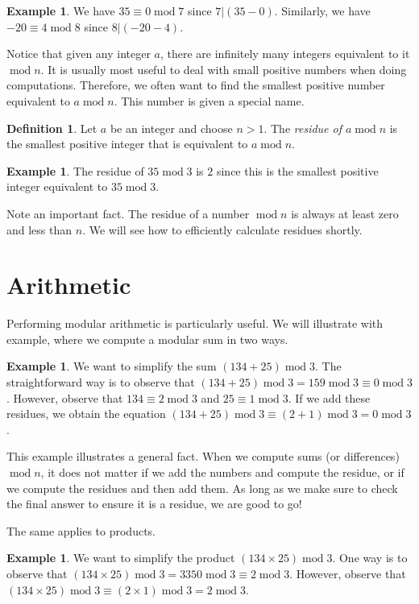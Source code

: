 \documentclass{book}
\theoremstyle{plain}
\theoremstyle{definition}
\newtheorem{definition}[theorem]{Definition}
\newtheorem{example}[theorem]{Example}
\renewcommand{\mod}{\operatorname{mod}}
\renewcommand{\mod}{\operatorname{mod}}
\begin{document}
\begin{example}
We have $35 \equiv 0 \mod 7$ since $7 | (35-0)$. Similarly, we have $-20 \equiv 4 \mod 8$ since $8 | (-20-4)$.
\end{example}

Notice that given any integer $a$, there are infinitely many integers equivalent to it $\mod n$. It is usually most useful to deal with small positive numbers when doing computations. Therefore, we often want to find the smallest positive number equivalent to $a \mod n$. This number is given a special name.

\begin{definition}
Let $a$ be an integer and choose $n > 1$. The {\it residue of $a \mod n$} is the smallest positive integer that is equivalent to $a \mod n$.
\end{definition}

\begin{example}
The residue of $35 \mod 3$ is $2$ since this is the smallest positive integer equivalent to $35 \mod 3$.
\end{example}

Note an important fact. The residue of a number $\mod n$ is always at least zero and less than $n$. We will see how to efficiently calculate residues shortly.

\section{Arithmetic}
Performing modular arithmetic is particularly useful. We will illustrate with example, where we compute a modular sum in two ways.

\begin{example}
We want to simplify the sum $(134 + 25) \mod 3$. The straightforward way is to observe that $(134 + 25) \mod 3 = 159 \mod 3 \equiv 0 \mod 3$. However, observe that $134 \equiv 2 \mod 3$ and $25 \equiv 1 \mod 3$. If we add these residues, we obtain the equation $(134 + 25) \mod 3 \equiv (2 + 1) \mod 3 = 0 \mod 3$.
\end{example}

This example illustrates a general fact. When we compute sums (or differences) $\mod n$, it does not matter if we add the numbers and compute the residue, or if we compute the residues and then add them. As long as we make sure to check the final answer to ensure it is a residue, we are good to go!

The same applies to products.

\begin{example}
We want to simplify the product $(134 \times 25) \mod 3$. One way is to observe that $(134 \times 25) \mod 3 = 3350 \mod 3 \equiv 2 \mod 3$. However, observe that $(134 \times 25) \mod 3 \equiv (2 \times 1) \mod 3 = 2 \mod 3$.
\end{example}
\end{document}
